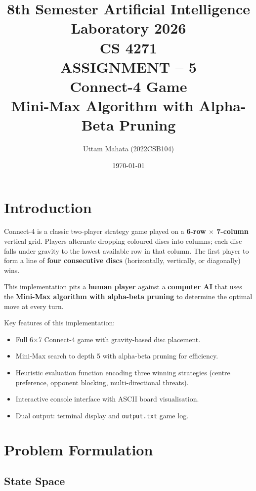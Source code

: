 \documentclass[12pt]{article}
\title{%
    \large 8th Semester Artificial Intelligence Laboratory 2026 \\[4pt]
    \large CS 4271 \\[10pt]
    \textbf{\LARGE ASSIGNMENT -- 5} \\[8pt]
    \textbf{\Large Connect-4 Game} \\[4pt]
    \large Mini-Max Algorithm with Alpha-Beta Pruning
}
\author{Uttam Mahata (2022CSB104)}
\date{\today}
\begin{document}
\maketitle
\tableofcontents
\newpage

\section{Introduction}

Connect-4 is a classic two-player strategy game played on a
\textbf{6-row $\times$ 7-column} vertical grid.
Players alternate dropping coloured discs into columns; each disc falls under
gravity to the lowest available row in that column.
The first player to form a line of \textbf{four consecutive discs}
(horizontally, vertically, or diagonally) wins.

This implementation pits a \textbf{human player} against a
\textbf{computer AI} that uses the \textbf{Mini-Max algorithm with
alpha-beta pruning} to determine the optimal move at every turn.

Key features of this implementation:
\begin{itemize}
    \item Full 6$\times$7 Connect-4 game with gravity-based disc placement.
    \item Mini-Max search to depth 5 with alpha-beta pruning for efficiency.
    \item Heuristic evaluation function encoding three winning strategies
          (centre preference, opponent blocking, multi-directional threats).
    \item Interactive console interface with ASCII board visualisation.
    \item Dual output: terminal display and \texttt{output.txt} game log.
\end{itemize}

\section{Problem Formulation}

\subsection{State Space}
\end{document}
